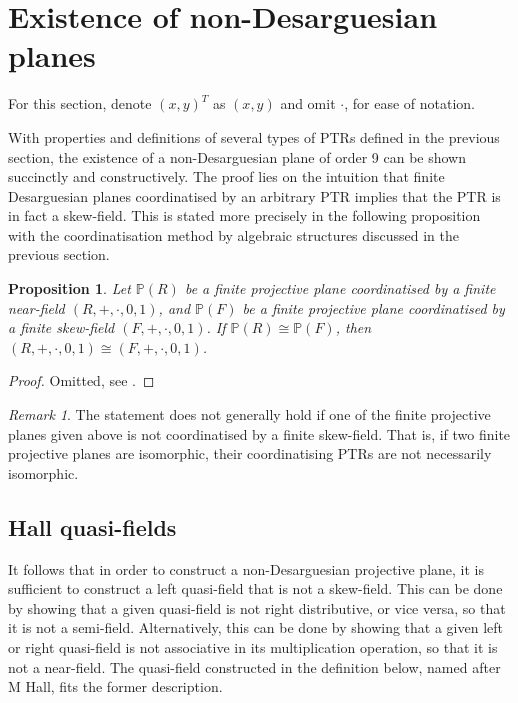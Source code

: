 \documentclass{report}
\renewcommand{\P}{\mathbb{P}}
\newtheorem{proposition}[theorem]{Proposition}
\theoremstyle{definition}\newtheorem*{definition}{Definition}
\theoremstyle{definition}\newtheorem*{example}{Example}
\theoremstyle{remark}\newtheorem*{remark}{Remark}
\begin{document}
\section{Existence of non-Desarguesian planes}

For this section, denote $ (x, y)^T $ as $ (x, y) $ and omit $ \cdot $, for ease of notation.

With properties and definitions of several types of PTRs defined in the previous section, the existence of a non-Desarguesian plane of order 9 can be shown succinctly and constructively. The proof lies on the intuition that finite Desarguesian planes coordinatised by an arbitrary PTR implies that the PTR is in fact a skew-field. This is stated more precisely in the following proposition with the coordinatisation method by algebraic structures discussed in the previous section.

\begin{proposition}
Let $ \P(R) $ be a finite projective plane coordinatised by a finite near-field $ (R, +, \cdot, 0, 1) $, and $ \P(F) $ be a finite projective plane coordinatised by a finite skew-field $ (F, +, \cdot, 0, 1) $. If $ \P(R) \cong \P(F) $, then $ (R, +, \cdot, 0, 1) \cong (F, +, \cdot, 0, 1) $.
\end{proposition}

\begin{proof}
Omitted, see \cite{affineplanes}.
\end{proof}

\begin{remark}
The statement does not generally hold if one of the finite projective planes given above is not coordinatised by a finite skew-field. That is, if two finite projective planes are isomorphic, their coordinatising PTRs are not necessarily isomorphic.
\end{remark}

\subsection{Hall quasi-fields}

It follows that in order to construct a non-Desarguesian projective plane, it is sufficient to construct a left quasi-field that is not a skew-field. This can be done by showing that a given quasi-field is not right distributive, or vice versa, so that it is not a semi-field. Alternatively, this can be done by showing that a given left or right quasi-field is not associative in its multiplication operation, so that it is not a near-field. The quasi-field constructed in the definition below, named after M Hall, fits the former description.
\end{document}
